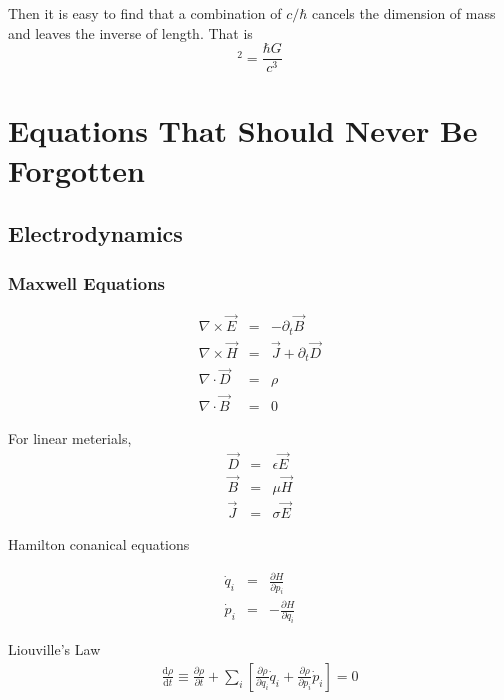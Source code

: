 \documentclass[11pt]{book}
\begin{document}
Then it is easy to find that a combination of $c/\hbar$ cancels the dimension of mass and leaves the inverse of length. That is
\begin{equation}
[Length]^2 = \frac{\hbar G}{c^3}
\end{equation}



\section{Equations That Should Never Be Forgotten}

\subsection{Electrodynamics}

\subsubsection{Maxwell Equations}
\begin{eqnarray}
\nabla\times\vec E&=&-\partial_t \vec B \\
\nabla\times\vec H&=&\vec J+\partial_t \vec D \\
\nabla\cdot \vec D&=&\rho \\
\nabla\cdot \vec B&=&0
\end{eqnarray}

For linear meterials, \begin{eqnarray}
\vec D&=&\epsilon \vec E \\
\vec B&=&\mu \vec H \\
\vec J&=& \sigma \vec E
\end{eqnarray}


Hamilton conanical equations

\begin{eqnarray}
\dot q_i &=& \frac{\partial H}{\partial p_i}  \\
\dot p_i &=& - \frac{\partial H}{\partial q_i}
\end{eqnarray}


Liouville's Law
\begin{eqnarray}
\frac{\mathrm d \rho}{\mathrm d t}\equiv \frac{\partial \rho}{\partial t} + \sum_i \left[ \frac{\partial \rho}{\partial q_i}\dot q_i + \frac{\partial \rho}{\partial p_i}\dot p_i \right] = 0
\end{eqnarray}
\end{document}
